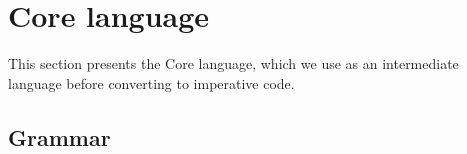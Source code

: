 \section{Core language}
\label{s:Core}

This section presents the Core language, which we use as an intermediate language before converting to imperative code.


\subsection{Grammar}





